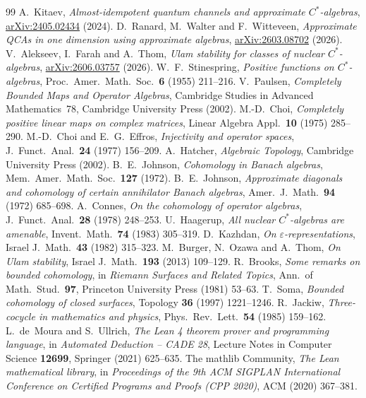 \documentclass[11pt]{article}
\theoremstyle{remark}
\begin{document}
\begin{thebibliography}{99}
 A.~Kitaev, \emph{Almost-idempotent quantum channels and approximate $C^*$-algebras}, \href{https://arxiv.org/abs/2405.02434}{arXiv:2405.02434} (2024).
 D.~Ranard, M.~Walter and F.~Witteveen, \emph{Approximate QCAs in one dimension using approximate algebras}, \href{https://arxiv.org/abs/2603.08702}{arXiv:2603.08702} (2026).
 V.~Alekseev, I.~Farah and A.~Thom, \emph{Ulam stability for classes of nuclear $C^*$-algebras}, \href{https://arxiv.org/abs/2606.03757}{arXiv:2606.03757} (2026).
 W.~F.~Stinespring, \emph{Positive functions on $C^*$-algebras}, Proc.\ Amer.\ Math.\ Soc.\ \textbf{6} (1955) 211--216.
 V.~Paulsen, \emph{Completely Bounded Maps and Operator Algebras}, Cambridge Studies in Advanced Mathematics~78, Cambridge University Press (2002).
 M.-D.~Choi, \emph{Completely positive linear maps on complex matrices}, Linear Algebra Appl.\ \textbf{10} (1975) 285--290.
 M.-D.~Choi and E.~G.~Effros, \emph{Injectivity and operator spaces}, J.\ Funct.\ Anal.\ \textbf{24} (1977) 156--209.
 A.~Hatcher, \emph{Algebraic Topology}, Cambridge University Press (2002).
 B.~E.~Johnson, \emph{Cohomology in Banach algebras}, Mem.\ Amer.\ Math.\ Soc.\ \textbf{127} (1972).
 B.~E.~Johnson, \emph{Approximate diagonals and cohomology of certain annihilator Banach algebras}, Amer.\ J.\ Math.\ \textbf{94} (1972) 685--698.
 A.~Connes, \emph{On the cohomology of operator algebras}, J.\ Funct.\ Anal.\ \textbf{28} (1978) 248--253.
 U.~Haagerup, \emph{All nuclear $C^*$-algebras are amenable}, Invent.\ Math.\ \textbf{74} (1983) 305--319.
 D.~Kazhdan, \emph{On $\varepsilon$-representations}, Israel J.\ Math.\ \textbf{43} (1982) 315--323.
 M.~Burger, N.~Ozawa and A.~Thom, \emph{On Ulam stability}, Israel J.\ Math.\ \textbf{193} (2013) 109--129.
 R.~Brooks, \emph{Some remarks on bounded cohomology}, in \emph{Riemann Surfaces and Related Topics}, Ann.\ of Math.\ Stud.\ \textbf{97}, Princeton University Press (1981) 53--63.
 T.~Soma, \emph{Bounded cohomology of closed surfaces}, Topology \textbf{36} (1997) 1221--1246.
 R.~Jackiw, \emph{Three-cocycle in mathematics and physics}, Phys.\ Rev.\ Lett.\ \textbf{54} (1985) 159--162.
 L.~de~Moura and S.~Ullrich, \emph{The Lean 4 theorem prover and programming language}, in \emph{Automated Deduction -- CADE 28}, Lecture Notes in Computer Science \textbf{12699}, Springer (2021) 625--635.
 The mathlib Community, \emph{The Lean mathematical library}, in \emph{Proceedings of the 9th ACM SIGPLAN International Conference on Certified Programs and Proofs (CPP 2020)}, ACM (2020) 367--381.
\end{thebibliography}
\end{document}
